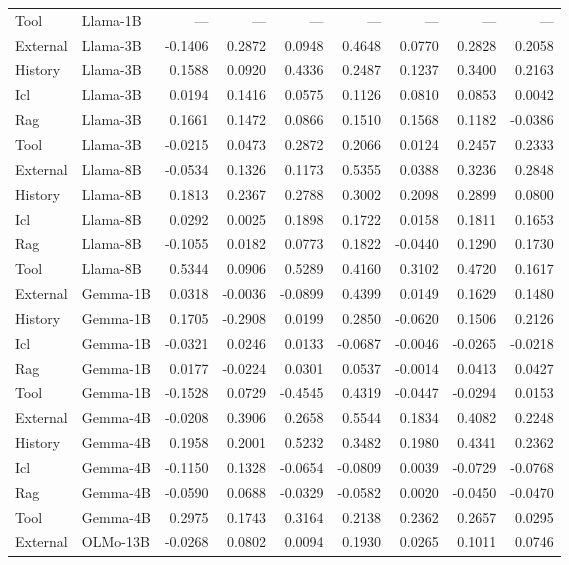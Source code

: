 \begin{tabular}{llrrrrrrr}
Tool & Llama-1B & --- & --- & --- & --- & --- & --- & --- \\
External & Llama-3B & -0.1406 & 0.2872 & 0.0948 & 0.4648 & 0.0770 & 0.2828 & 0.2058 \\
History & Llama-3B & 0.1588 & 0.0920 & 0.4336 & 0.2487 & 0.1237 & 0.3400 & 0.2163 \\
Icl & Llama-3B & 0.0194 & 0.1416 & 0.0575 & 0.1126 & 0.0810 & 0.0853 & 0.0042 \\
Rag & Llama-3B & 0.1661 & 0.1472 & 0.0866 & 0.1510 & 0.1568 & 0.1182 & -0.0386 \\
Tool & Llama-3B & -0.0215 & 0.0473 & 0.2872 & 0.2066 & 0.0124 & 0.2457 & 0.2333 \\
External & Llama-8B & -0.0534 & 0.1326 & 0.1173 & 0.5355 & 0.0388 & 0.3236 & 0.2848 \\
History & Llama-8B & 0.1813 & 0.2367 & 0.2788 & 0.3002 & 0.2098 & 0.2899 & 0.0800 \\
Icl & Llama-8B & 0.0292 & 0.0025 & 0.1898 & 0.1722 & 0.0158 & 0.1811 & 0.1653 \\
Rag & Llama-8B & -0.1055 & 0.0182 & 0.0773 & 0.1822 & -0.0440 & 0.1290 & 0.1730 \\
Tool & Llama-8B & 0.5344 & 0.0906 & 0.5289 & 0.4160 & 0.3102 & 0.4720 & 0.1617 \\
External & Gemma-1B & 0.0318 & -0.0036 & -0.0899 & 0.4399 & 0.0149 & 0.1629 & 0.1480 \\
History & Gemma-1B & 0.1705 & -0.2908 & 0.0199 & 0.2850 & -0.0620 & 0.1506 & 0.2126 \\
Icl & Gemma-1B & -0.0321 & 0.0246 & 0.0133 & -0.0687 & -0.0046 & -0.0265 & -0.0218 \\
Rag & Gemma-1B & 0.0177 & -0.0224 & 0.0301 & 0.0537 & -0.0014 & 0.0413 & 0.0427 \\
Tool & Gemma-1B & -0.1528 & 0.0729 & -0.4545 & 0.4319 & -0.0447 & -0.0294 & 0.0153 \\
External & Gemma-4B & -0.0208 & 0.3906 & 0.2658 & 0.5544 & 0.1834 & 0.4082 & 0.2248 \\
History & Gemma-4B & 0.1958 & 0.2001 & 0.5232 & 0.3482 & 0.1980 & 0.4341 & 0.2362 \\
Icl & Gemma-4B & -0.1150 & 0.1328 & -0.0654 & -0.0809 & 0.0039 & -0.0729 & -0.0768 \\
Rag & Gemma-4B & -0.0590 & 0.0688 & -0.0329 & -0.0582 & 0.0020 & -0.0450 & -0.0470 \\
Tool & Gemma-4B & 0.2975 & 0.1743 & 0.3164 & 0.2138 & 0.2362 & 0.2657 & 0.0295 \\
External & OLMo-13B & -0.0268 & 0.0802 & 0.0094 & 0.1930 & 0.0265 & 0.1011 & 0.0746 \\

\end{tabular}
